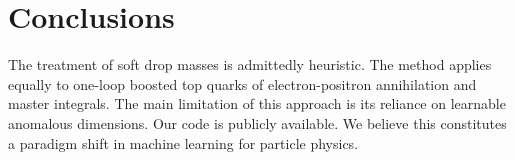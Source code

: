 \section{Conclusions}\label{sec:conclusions}

The treatment of soft drop masses is admittedly heuristic. The method
applies equally to one-loop boosted top quarks of electron-positron
annihilation and master integrals. The main limitation of this approach
is its reliance on learnable anomalous dimensions. Our code is publicly
available. We believe this constitutes a paradigm shift in machine
learning for particle physics.

